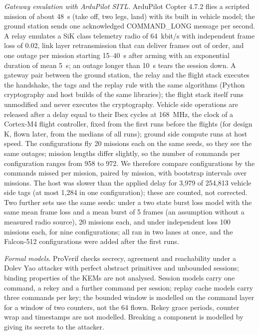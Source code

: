 \documentclass[conference]{IEEEtran}
\begin{document}
\emph{Gateway emulation with ArduPilot SITL.} ArduPilot Copter 4.7.2 \cite{ardupilot} flies a scripted mission of about 48~s (take off, two legs, land) with its built in vehicle model; the ground station sends one acknowledged COMMAND\_LONG message per second. A relay emulates a SiK class telemetry radio of 64~kbit/s with independent frame loss of 0.02, link layer retransmission that can deliver frames out of order, and one outage per mission starting 15--40~s after arming with an exponential duration of mean 5~s; an outage longer than 10~s tears the session down. A gateway pair between the ground station, the relay and the flight stack executes the handshake, the tags and the replay rule with the same algorithms (Python cryptography and host builds of the same libraries); the flight stack itself runs unmodified and never executes the cryptography. Vehicle side operations are released after a delay equal to their Ibex cycles at 168~MHz, the clock of a Cortex-M4 flight controller, fixed from the first runs before the flights (for design K, flown later, from the medians of all runs); ground side compute runs at host speed. The configurations fly 20 missions each on the same seeds, so they see the same outages; mission lengths differ slightly, so the number of commands per configuration ranges from 958 to 972. We therefore compare configurations by the commands missed per mission, paired by mission, with bootstrap intervals over missions. The host was slower than the applied delay for 3,979 of 254,813 vehicle side tags (at most 1,284 in one configuration); these are counted, not corrected. Two further sets use the same seeds: under a two state burst loss model with the same mean frame loss and a mean burst of 5 frames (an assumption without a measured radio source), 20 missions each, and under independent loss 100 missions each, for nine configurations; all ran in two lanes at once, and the Falcon-512 configurations were added after the first runs.

\emph{Formal models.} ProVerif \cite{proverif} checks secrecy, agreement and reachability under a Dolev Yao attacker with perfect abstract primitives and unbounded sessions; binding properties of the KEMs are not analysed. Session models carry one command, a rekey and a further command per session; replay cache models carry three commands per key; the bounded window is modelled on the command layer for a window of two counters, not the 64 flown. Rekey grace periods, counter wrap and timestamps are not modelled. Breaking a component is modelled by giving its secrets to the attacker.
\end{document}
